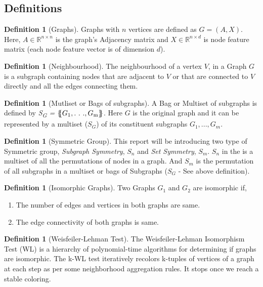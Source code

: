\documentclass[11pt, dvipsnames, DIV=12]{scrreprt}
\theoremstyle{definition}
\newtheorem{definition}[theorem]{Definition}
\begin{document}
\subsection{Definitions}
\begin{definition}[Graphs]
\label{def:graph_def}
Graphs with $n$ vertices are defined as $G=(A,X)$. Here, $A\in\mathbb{R}^{n\times n}$ is the graph's Adjacency matrix and $X\in\mathbb{R}^{n\times d}$ is node feature matrix (each node feature vector is of dimension $d$).
\end{definition}
\begin{definition}[Neighbourhood]
\label{def:neighbourhood_def}
The neighbourhood of a vertex $V$, in a Graph $G$ is a subgraph containing nodes that are adjacent to $V$ or that are connected to $V$ directly and all the edges connecting them. 
\end{definition}
\begin{definition}[Mutliset or Bags of subgraphs]
A Bag or Multiset of subgraphs is defined by \emph{S\textsubscript{G} = $\{\!\!\{G\textsubscript{1},.\ .\ .,G\textsubscript{m}\}\!\!\}$}. Here $G$ is the original graph and it can be represented by a multiset ($S_G$) of its constituent subgraphs $G_1,...,G_m$.
\label{def:multiset_bag}
\end{definition}
\begin{definition}[Symmetric Group]
This report will be introducing two type of Symmetric group, \textit{Subgraph Symmetry}, $S_n$ and \textit{Set Symmetry}, $S_m$. $S_n$ in the is a multiset of all the permutations of nodes in a graph. And $S_m$ is the permutation of all subgraphs in a multiset or bags of Subgraphs ($S_G$ - See above definition). 
\end{definition}
\begin{definition}[Isomorphic Graphs]
\label{def:isomporphism}
Two Graphs $G_1$ and $G_2$ are isomorphic if,
\begin{enumerate}
    \item The number of edges and vertices in both graphs are same.
    \item The edge connectivity of both graphs is same.
\end{enumerate}
\end{definition}
\begin{definition}[Weisfeiler-Lehman Test]
\label{def:wl_test}
The Weisfeiler-Lehman Isomorphism Test (WL) \citep{weisfeiler_1968} is a hierarchy of polynomial-time algorithms for determining if graphs are isomorphic. The k-WL test iteratively recolors k-tuples of vertices of a graph at each step as per some neighborhood aggregation rules. It stops once we reach a stable coloring.
\end{definition}
\end{document}
